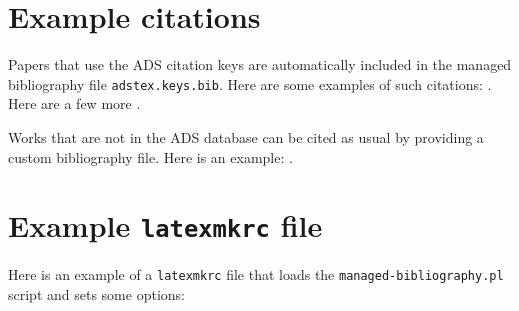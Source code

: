 \documentclass{article}
\begin{document}


\section{Example citations}
Papers that use the ADS citation keys are automatically included in the managed bibliography file \texttt{adstex.keys.bib}.
Here are some examples of such citations:
\cite{%
    1958ZA.....46..108B,%
    1962AJ.....67..471K,%
    1966AJ.....71...64K%
}. 
Here are a few more
\cite{2002Sci...295...82K,2003PASP..115..763C}. 

Works that are not in the ADS database can be cited as usual by providing a custom bibliography file. Here is an example: \cite{mcgrail2004}.


\section{Example \texttt{latexmkrc} file}
Here is an example of a \texttt{latexmkrc} file that loads the \texttt{managed-bibliography.pl} script and sets some options:






\end{document}
